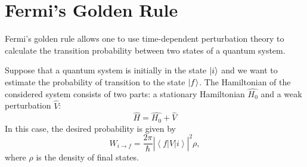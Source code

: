 \section{Fermi's Golden Rule}
Fermi's golden rule allows one to use time-dependent perturbation theory
to calculate the transition probability between two states of a quantum
system.

\begin{theorem}
  \label{addQuantGoldenRuleFermi}
  Suppose that a quantum system is initially in the state
  $\ket{i}$ and we want to estimate the probability of transition to the state
  $\ket{f}$. The Hamiltonian of the considered system consists of
  two parts: a stationary Hamiltonian $\hat{H_0}$ and a weak
  perturbation $\hat{V}$:
  \begin{equation}
    \hat{H} = \hat{H_0} + \hat{V}
    \nonumber
  \end{equation}
  In this case, the desired probability is given by
  \begin{equation}
    W_{i \rightarrow f} = \frac{2 \pi}{\hbar}
    \left|
    \left<
    f
    \right|
    \hat{V}
    \left|
    i
    \right>
    \right|^2 \rho
    \nonumber,
  \end{equation}
  where $\rho$ is the density of final states.
\end{theorem}


